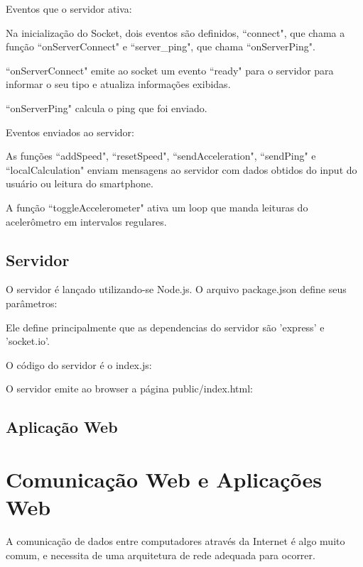 \documentclass[a4paper,12pt]{article}
\begin{document}
Eventos que o servidor ativa:

Na inicialização do Socket, dois eventos são definidos, “connect", que chama a função “onServerConnect" e “server\_ping", que chama “onServerPing".

“onServerConnect" emite ao socket um evento “ready" para o servidor para informar o seu tipo e atualiza informações exibidas.

“onServerPing" calcula o ping que foi enviado.


Eventos enviados ao servidor:

As funções “addSpeed", “resetSpeed", “sendAcceleration", “sendPing" e “localCalculation" enviam mensagens ao servidor com dados obtidos do input do usuário ou leitura do smartphone.

A função “toggleAccelerometer" ativa um loop que manda leituras do acelerômetro em intervalos regulares.


\newpage
\subsection{Servidor}

O servidor é lançado utilizando-se Node.js. O arquivo package.json define seus parâmetros:


Ele define principalmente que as dependencias do servidor são 'express' e 'socket.io'.

O código do servidor é o index.js:



O servidor emite ao browser a página public/index.html:







\newpage
\subsection{Aplicação Web}







\section{Comunicação Web e Aplicações Web}

A comunicação de dados entre computadores através da Internet é algo muito comum, e necessita de uma arquitetura de rede adequada para ocorrer.
\end{document}
